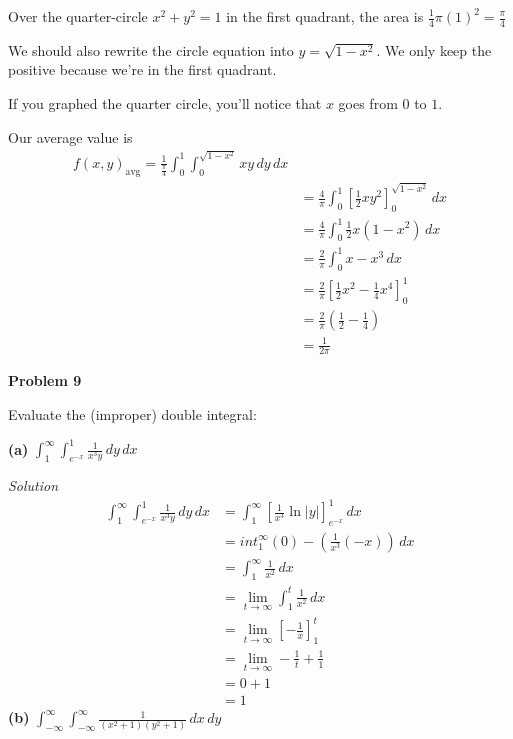 \documentclass{article}
\newcommand{\lrp}[1]{\left( #1 \right)}
\newcommand{\lrb}[1]{\left[ #1 \right]}
\newcommand{\Solution}{\textit{Solution}}
\begin{document}
Over the quarter-circle $x^2+y^2=1$ in the first quadrant, the area is $\displaystyle \frac{1}{4}\pi (1)^2=\frac{\pi}{4}$

We should also rewrite the circle equation into $y=\sqrt{1-x^2}$. We only keep the positive because we're in the first quadrant.

If you graphed the quarter circle, you'll notice that $x$ goes from $0$ to $1$.

Our average value is
\begin{align*}
    f(x,y)_{\text{avg}}=\frac{1}{\frac{\pi}{4}}\int_0^1\int_0^{\sqrt{1-x^2}} xy\,dy\,dx\\
    &=\frac{4}{\pi}\int_0^1\lrb{\frac{1}{2}xy^2}_0^{\sqrt{1-x^2}}\,dx\\
    &=\frac{4}{\pi}\int_0^1 \frac{1}{2}x(1-x^2)\,dx\\
    &=\frac{2}{\pi}\int_0^1 x-x^3\,dx\\
    &=\frac{2}{\pi}\lrb{\frac{1}{2}x^2-\frac{1}{4}x^4}_0^1\\
    &=\frac{2}{\pi}\lrp{\frac{1}{2}-\frac{1}{4}}\\
    &=\boxed{\frac{1}{2\pi}}
\end{align*}

\textbf{Problem 9}

Evaluate the (improper) double integral:

\textbf{(a)} $\displaystyle \int_1^{\infty}\int_{e^{-x}}^1\frac{1}{x^3y}\,dy\,dx$

\Solution
\begin{align*}
    \int_1^{\infty}\int_{e^{-x}}^1\frac{1}{x^3y}\,dy\,dx&=\int_1^\infty \lrb{\frac{1}{x^3}\ln\left|y\right|}_{e^{-x}}^1\,dx\\
    &=int_1^\infty (0)-\lrp{\frac{1}{x^3}(-x)}\,dx\\
    &=\int_1^\infty \frac{1}{x^2}\,dx\\
    &=\lim_{t\to\infty}\int_1^t \frac{1}{x^2}\,dx\\
    &=\lim_{t\to\infty}\lrb{-\frac{1}{x}}_1^t\\
    &=\lim_{t\to\infty} -\frac{1}{t}+\frac{1}{1}\\
    &=0+1\\
    &=\boxed{1}
\end{align*}
\textbf{(b)} $\displaystyle \int_{-\infty}^\infty\int_{-\infty}^\infty \frac{1}{(x^2+1)(y^2+1)}\,dx\,dy$
\end{document}
